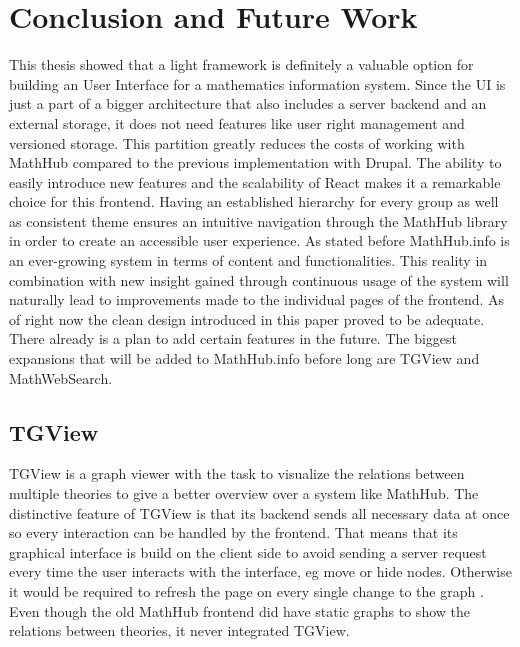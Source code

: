 \documentclass[11pt,a4paper]{article}
\begin{document}
\section{Conclusion and Future Work} \label{conclusion}
This thesis showed that a light framework is definitely a valuable option for building an User Interface for a mathematics information system.
Since the UI is just a part of a bigger architecture that also includes a server backend and an external storage, it does not need features like user right management and versioned storage.
This partition greatly reduces the costs of working with MathHub compared to the previous implementation with Drupal.
The ability to easily introduce new features and the scalability of React makes it a remarkable choice for this frontend.
\newline \newline
Having an established hierarchy for every group as well as consistent theme ensures an intuitive navigation through the MathHub library in order to create an accessible user experience.
As stated before MathHub.info is an ever-growing system in terms of content and functionalities.
This reality in combination with new insight gained through continuous usage of the system will naturally lead to improvements made to the individual pages of the frontend.
As of right now the clean design introduced in this paper proved to be adequate.
\newline \newline
There already is a plan to add certain features in the future. 
The biggest expansions that will be added to MathHub.info before long are TGView and MathWebSearch.

\subsection{TGView} 
TGView is a graph viewer with the task to visualize the relations between multiple theories to give a better overview over a system like MathHub.
The distinctive feature of TGView is that its backend sends all necessary data at once so every interaction can be handled by the frontend.
That means that its graphical interface is build on the client side to avoid sending a server request every time the user interacts with the interface, eg move or hide nodes.
Otherwise it would be required to refresh the page on every single change to the graph \cite{tgview}.
\newline \newline 
Even though the old MathHub frontend did have static graphs to show the relations between theories, it never integrated TGView.
 
\end{document}
